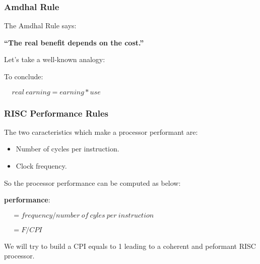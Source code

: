 
\begin{frame}
  \frametitle{Amdhal Rule}

  The Amdhal Rule says:

  \-

  \textbf{``The real benefit depends on the cost.''}

  \-

  Let's take a well-known analogy:

  \begin{center}
  \end{center}

  To conclude:

  \-

  $~~~~~real~earning = earning * use$
\end{frame}


\begin{frame}
  \frametitle{RISC Performance Rules}

  The two caracteristics which make a processor performant are:

  \begin{itemize}
    \item
      Number of cycles per instruction.
    \item
      Clock frequency.
  \end{itemize}

  So the processor performance can be computed as below:

  \-

  \textbf{performance}:

  $~~~~~= frequency / number~of~cyles~per~instruction$

  $~~~~~= F / CPI$

  \-

  We will try to build a CPI equals to 1 leading to a coherent and peformant
  RISC processor.
\end{frame}



